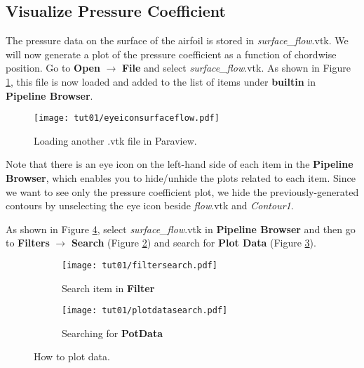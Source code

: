 \subsection{Visualize Pressure Coefficient}
The pressure data on the surface of the airfoil is stored in \textit{surface\_flow}.vtk. We will now generate a plot of the pressure coefficient as a function of chordwise position. Go to \textbf{Open} $\rightarrow$ \textbf{File} and select \textit{surface\_flow}.vtk. As shown in Figure \ref{fig1:builtin}, this file is now loaded and added to the list of items under \textbf{builtin} in \textbf{Pipeline Browser}.
\begin{figure}[htbp]
    \centering
    \texttt{[image: tut01/eyeiconsurfaceflow.pdf]}
    \caption{Loading another .vtk file in Paraview.}
    \label{fig1:builtin}
\end{figure}
Note that there is an eye icon on the left-hand side of each item in the \textbf{Pipeline Browser}, which enables you to hide/unhide the plots related to each item. Since we want to see only the pressure coefficient plot, we hide the previously-generated contours by unselecting the eye icon beside \textit{flow}.vtk and \textit{Contour1}. 

As shown in Figure \ref{fig1:plotdata}, select \textit{surface\_flow}.vtk in \textbf{Pipeline Browser} and then go to \textbf{Filters} $\rightarrow$ \textbf{Search} (Figure \ref{fig1:plotdata a}) and search for \textbf{Plot Data} (Figure \ref{fig1:plotdata b}). 
\begin{figure}[htbp]
    \centering
     \begin{subfigure}[b]{.4\textwidth}
         \centering
         \texttt{[image: tut01/filtersearch.pdf]}
         \caption{Search item in \textbf{Filter}}
         \label{fig1:plotdata a}
     \end{subfigure}
     \hfill
     \begin{subfigure}[b]{.4\textwidth}
         \centering
         \texttt{[image: tut01/plotdatasearch.pdf]}
         \caption{Searching for \textbf{PotData}}
         \label{fig1:plotdata b}
     \end{subfigure}     
    \caption{How to plot data.}
    \label{fig1:plotdata}
\end{figure}

